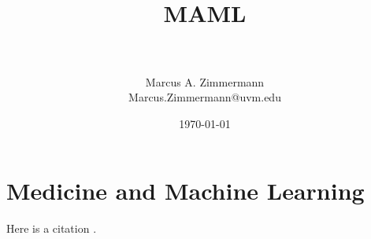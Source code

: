 \documentclass[letterpaper, 10pt,DIV=13]{scrartcl}
\title{	
   \normalfont \normalsize 
   \horrule{0.5pt} \\[0.25cm] 	%
   \huge MAML  \\     	    	%
   \horrule{0.5pt} \\[0.25cm] 	%
}
\author{Marcus A. Zimmermann \\ \normalsize Marcus.Zimmermann@uvm.edu}
\date{\normalsize\today} 	%
\numberwithin{equation}{section} %
\numberwithin{figure}{section} %
\numberwithin{table}{section} %
\begin{document}
\maketitle %

\section{Medicine and Machine Learning}

Here is a citation \cite{BOOK}.




\end{document}
